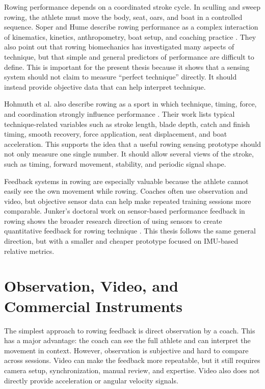 Rowing performance depends on a coordinated stroke cycle. In sculling and sweep rowing, the athlete must move the body, seat, oars, and boat in a controlled sequence. Soper and Hume describe rowing performance as a complex interaction of kinematics, kinetics, anthropometry, boat setup, and coaching practice \cite{soper_towards_2004}. They also point out that rowing biomechanics has investigated many aspects of technique, but that simple and general predictors of performance are difficult to define. This is important for the present thesis because it shows that a sensing system should not claim to measure ``perfect technique'' directly. It should instead provide objective data that can help interpret technique.

Hohmuth et al. also describe rowing as a sport in which technique, timing, force, and coordination strongly influence performance \cite{hohmuth_wireless_2023}. Their work lists typical technique-related variables such as stroke length, blade depth, catch and finish timing, smooth recovery, force application, seat displacement, and boat acceleration. This supports the idea that a useful rowing sensing prototype should not only measure one single number. It should allow several views of the stroke, such as timing, forward movement, stability, and periodic signal shape.

Feedback systems in rowing are especially valuable because the athlete cannot easily see the own movement while rowing. Coaches often use observation and video, but objective sensor data can help make repeated training sessions more comparable. Junker's doctoral work on sensor-based performance feedback in rowing shows the broader research direction of using sensors to create quantitative feedback for rowing technique \cite{junker_sensor-based_2015}. This thesis follows the same general direction, but with a smaller and cheaper prototype focused on IMU-based relative metrics.

\section{Observation, Video, and Commercial Instruments}

The simplest approach to rowing feedback is direct observation by a coach. This has a major advantage: the coach can see the full athlete and can interpret the movement in context. However, observation is subjective and hard to compare across sessions. Video can make the feedback more repeatable, but it still requires camera setup, synchronization, manual review, and expertise. Video also does not directly provide acceleration or angular velocity signals.

